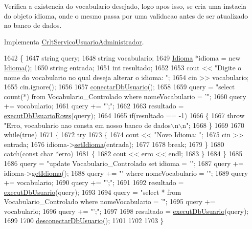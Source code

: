 Verifica a existencia do vocabulario desejado, logo apos isso, se cria uma instacia do objeto idioma, onde o mesmo passa por uma validacao antes de ser atualizado no banco de dados.

Implementa \mbox{\hyperlink{class_crlt_servico_usuario_administrador_adf459478defbc327815266343866a1ab}{Crlt\+Servico\+Usuario\+Administrador}}.


\begin{DoxyCode}
1642 \{
1647     \textcolor{keywordtype}{string} query;
1648     \textcolor{keywordtype}{string} vocabulario;
1649     \mbox{\hyperlink{class_idioma}{Idioma}} *idioma = \textcolor{keyword}{new} \mbox{\hyperlink{class_idioma}{Idioma}}();
1650     \textcolor{keywordtype}{string} entrada;
1651     \textcolor{keywordtype}{int} resultado;
1652 
1653     cout << \textcolor{stringliteral}{"Digite o nome do vocabulario no qual deseja alterar o idioma: "};
1654     cin >> vocabulario;
1655     cin.ignore();
1656 
1657     \mbox{\hyperlink{comando_sql_8cpp_a4f89ddcbc4cf8f2587d89f72f8c7900d}{conectarDbUsuario}}();
1658 
1659     query = \textcolor{stringliteral}{"select count(*) from Vocabulario\_Controlado where nomeVocabulario = '"};
1660     query += vocabulario;
1661     query += \textcolor{stringliteral}{"';"};
1662 
1663     resultado = \mbox{\hyperlink{comando_sql_8cpp_af54952694f2fa7d76f969fb74b853cb9}{executDbUsuarioRows}}(query);
1664 
1665     \textcolor{keywordflow}{if}(resultado == -1)
1666     \{
1667       \textcolor{keywordflow}{throw} \textcolor{stringliteral}{"Erro, vocabulario nao consta em nosso banco de dados\(\backslash\)n\(\backslash\)n"};
1668     \}
1669 
1670     \textcolor{keywordflow}{while}(\textcolor{keyword}{true})
1671     \{
1672       \textcolor{keywordflow}{try}
1673       \{
1674         cout << \textcolor{stringliteral}{"Novo Idioma: "};
1675         cin >> entrada;
1676         idioma->\mbox{\hyperlink{class_idioma_a5c15660dcb0cec1db37a013b990d9895}{setIdioma}}(entrada);
1677 
1678         \textcolor{keywordflow}{break};
1679       \}
1680       \textcolor{keywordflow}{catch}(\textcolor{keyword}{const} \textcolor{keywordtype}{char} *erro)
1681       \{
1682         cout << erro << endl;
1683       \}
1684     \}
1685 
1686     query = \textcolor{stringliteral}{"update Vocabulario\_Controlado set idioma = '"};
1687     query += idioma->\mbox{\hyperlink{class_idioma_ab2f6141eec870d6c40f6ec8d32e68231}{getIdioma}}();
1688     query += \textcolor{stringliteral}{"' where nomeVocabulario = '"};
1689     query += vocabulario;
1690     query += \textcolor{stringliteral}{"';"};
1691 
1692     resultado = \mbox{\hyperlink{comando_sql_8cpp_a748197580e7f9acdbf48c78de1f7924b}{executDbUsuario}}(query);
1693 
1694     query = \textcolor{stringliteral}{"select * from Vocabulario\_Controlado where nomeVocabulario = '"};
1695     query += vocabulario;
1696     query += \textcolor{stringliteral}{"';"};
1697 
1698     resultado = \mbox{\hyperlink{comando_sql_8cpp_a748197580e7f9acdbf48c78de1f7924b}{executDbUsuario}}(query);
1699 
1700     \mbox{\hyperlink{comando_sql_8cpp_a969be9911913568e30d4ae8963338bc3}{desconectarDbUsuario}}();
1701 
1702 
1703 \}
\end{DoxyCode}
